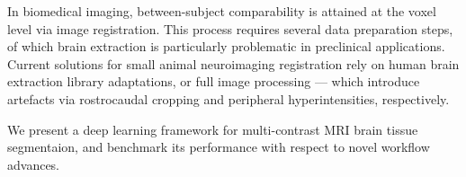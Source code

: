 In biomedical imaging, between-subject comparability is attained at the voxel level via image registration.
This process requires several data preparation steps, of which brain extraction is particularly problematic in preclinical applications.
Current solutions for small animal neuroimaging registration rely on human brain extraction library adaptations, or full image processing — which introduce artefacts via rostrocaudal cropping and peripheral hyperintensities, respectively.
\vspace{.8em}

We present a deep learning framework for multi-contrast MRI brain tissue segmentaion, and benchmark its performance with respect to novel workflow advances.